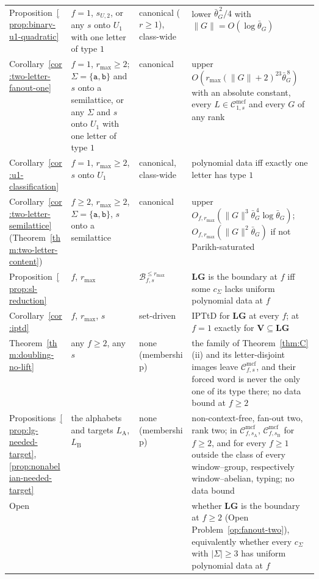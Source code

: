 \documentclass[11pt]{article}
\numberwithin{equation}{section}
\theoremstyle{plain}
\theoremstyle{definition}
\theoremstyle{remark}
\newcommand{\Cmcf}[2]{\mathcal{C}^{\mathrm{mcf}}_{#1,#2}}
\theoremstyle{plain}
\begin{document}
\begin{table}[htbp]
\begin{tabularx}{\linewidth}{@{}>{\raggedright\arraybackslash}p{0.2\linewidth}>{\raggedright\arraybackslash}p{0.22\linewidth}>{\raggedright\arraybackslash}p{0.17\linewidth}>{\raggedright\arraybackslash}X@{}}
Proposition~\ref{prop:binary-u1-quadratic}
 & $f=1$, $s_{U,2}$, or any $s$ onto $U_1$ with one letter of type $1$
 & canonical ($r\ge1$), class-wide
 & lower $\bar\theta_G^{\,2}/4$ with $\|G\|=O(\log\bar\theta_G)$\\
Corollary~\ref{cor:two-letter-fanout-one}
 & $f=1$, $r_{\max}\ge2$; $\Sigma=\{\mathtt a,\mathtt b\}$ and $s$ onto a semilattice, or any $\Sigma$ and $s$ onto $U_1$ with one letter of type $1$
 & canonical
 & upper $O(r_{\max}(\|G\|+2)^{23}\bar\theta_G^{\,8})$ with an absolute constant, every $L\in\Cmcf{1}{s}$ and every $G$ of any rank\\
Corollary~\ref{cor:u1-classification}
 & $f=1$, $r_{\max}\ge2$, $s$ onto $U_1$
 & canonical, class-wide
 & polynomial data iff exactly one letter has type $1$\\
Corollary~\ref{cor:two-letter-semilattice} (Theorem~\ref{thm:two-letter-content})
 & $f\ge2$, $r_{\max}\ge2$, $\Sigma=\{\mathtt a,\mathtt b\}$, $s$ onto a semilattice
 & canonical
 & upper $O_{f,r_{\max}}(\|G\|^3\bar\theta_G^{\,4}\log\bar\theta_G)$; $O_{f,r_{\max}}(\|G\|^2\bar\theta_G)$ if not Parikh-saturated\\
Proposition~\ref{prop:sl-reduction}
 & $f$, $r_{\max}$
 & $\mathcal B^{\le r_{\max}}_{f,s}$
 & $\mathbf{LG}$ is the boundary at $f$ iff some $c_\Sigma$ lacks uniform polynomial data at $f$\\
Corollary~\ref{cor:iptd}
 & $f$, $r_{\max}$, $s$
 & set-driven
 & IPTtD for $\mathbf{LG}$ at every $f$; at $f=1$ exactly for $\mathbf{V}\subseteq\mathbf{LG}$\\
Theorem~\ref{thm:doubling-no-lift}
 & any $f\ge2$, any $s$
 & none (membership)
  & the family of Theorem~\ref{thm:C}(ii) and its letter-disjoint images leave $\Cmcf{f}{s}$, and their forced word is never the only one of its type there; no data bound at $f\ge2$\\
Propositions~\ref{prop:lg-needed-target}, \ref{prop:nonabelian-needed-target}
 & the alphabets and targets $L_{\mathrm A}$, $L_{\mathrm B}$
 & none (membership)
 & non-context-free, fan-out two, rank two; in $\Cmcf{f}{s_{\mathrm A}}$, $\Cmcf{f}{s_{\mathrm B}}$ for $f\ge2$, and for every $f\ge1$ outside the class of every window--group, respectively window--abelian, typing; no data bound\\
Open
 & 
 & 
 & whether $\mathbf{LG}$ is the boundary at $f\ge2$ (Open Problem~\ref{op:fanout-two}), equivalently whether every $c_\Sigma$ with $|\Sigma|\ge3$ has uniform polynomial data at $f$\\
\hline
\end{tabularx}
\end{table}
\end{document}
